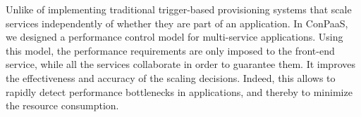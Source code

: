 Unlike of implementing traditional trigger-based provisioning systems that scale services independently of whether they are part of an application. In ConPaaS, we designed a performance control model for multi-service applications. Using this model, the performance requirements are only imposed to the front-end service, while all the services collaborate in order to guarantee them. It improves the effectiveness and accuracy of the scaling decisions. Indeed, this allows to rapidly detect performance bottlenecks in applications, and thereby to minimize the resource consumption.




 

